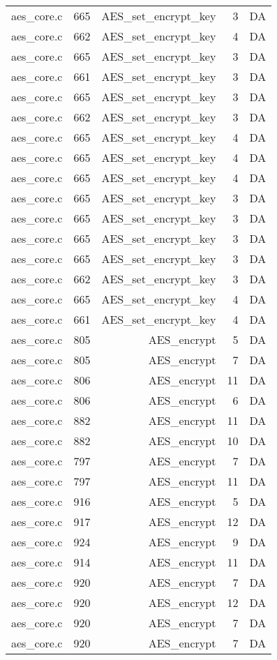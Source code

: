 \begin{table*}
\begin{tabular}{clrrr}
aes\_core.c&665&AES\_set\_encrypt\_key&3 &DA\\
aes\_core.c&662&AES\_set\_encrypt\_key&4 &DA\\
aes\_core.c&665&AES\_set\_encrypt\_key&3 &DA\\
aes\_core.c&661&AES\_set\_encrypt\_key&3 &DA\\
aes\_core.c&665&AES\_set\_encrypt\_key&3 &DA\\
aes\_core.c&662&AES\_set\_encrypt\_key&3 &DA\\
aes\_core.c&665&AES\_set\_encrypt\_key&4 &DA\\
aes\_core.c&665&AES\_set\_encrypt\_key&4 &DA\\
aes\_core.c&665&AES\_set\_encrypt\_key&4 &DA\\
aes\_core.c&665&AES\_set\_encrypt\_key&3 &DA\\
aes\_core.c&665&AES\_set\_encrypt\_key&3 &DA\\
aes\_core.c&665&AES\_set\_encrypt\_key&3 &DA\\
aes\_core.c&665&AES\_set\_encrypt\_key&3 &DA\\
aes\_core.c&662&AES\_set\_encrypt\_key&3 &DA\\
aes\_core.c&665&AES\_set\_encrypt\_key&4 &DA\\
aes\_core.c&661&AES\_set\_encrypt\_key&4 &DA\\
aes\_core.c&805&AES\_encrypt&5 &DA\\
aes\_core.c&805&AES\_encrypt&7 &DA\\
aes\_core.c&806&AES\_encrypt&11&DA\\
aes\_core.c&806&AES\_encrypt&6 &DA\\
aes\_core.c&882&AES\_encrypt&11&DA\\
aes\_core.c&882&AES\_encrypt&10&DA\\
aes\_core.c&797&AES\_encrypt&7 &DA\\
aes\_core.c&797&AES\_encrypt&11&DA\\
aes\_core.c&916&AES\_encrypt&5 &DA\\
aes\_core.c&917&AES\_encrypt&12&DA\\
aes\_core.c&924&AES\_encrypt&9 &DA\\
aes\_core.c&914&AES\_encrypt&11&DA\\
aes\_core.c&920&AES\_encrypt&7 &DA\\
aes\_core.c&920&AES\_encrypt&12&DA\\
aes\_core.c&920&AES\_encrypt&7 &DA\\
aes\_core.c&920&AES\_encrypt&7 &DA\\

\end{tabular}
\end{table*}
